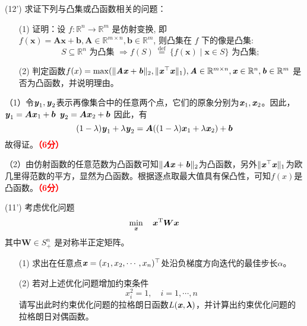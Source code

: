 \documentclass[12pt,a4paper,openany,twoside]{ctexbook}
\begin{document}
\begin{exercise}(12')
	求证下列与凸集或凸函数相关的问题：
	\begin{itemize}
		\item[(1)] 证明：设 $f: \mathbb{R}^{n} \rightarrow \mathbb{R}^{m}$ 是仿射变换, 即 $f(\boldsymbol{x})=\boldsymbol{A} \boldsymbol{x}+\boldsymbol{b}, \boldsymbol{A} \in \mathbb{R}^{m \times n}, \boldsymbol{b} \in \mathbb{R}^{m}$, 则凸集在 $f$ 下的像是凸集:
		$$
		S \subseteq \mathbb{R}^{n} \text { 为凸集 } \Rightarrow f(S) \stackrel{\text { def }}{=}\{f(\boldsymbol{x}) \mid \boldsymbol{x} \in S\} \text { 为凸集; }
		$$
		\item [(2)] 判定函数$f(x)=\max(\|\boldsymbol{\mathit{A}}\boldsymbol{\mathit{x}}+\boldsymbol{\mathit{b}}\|_2,\|\boldsymbol{\mathit{x}}^\top \boldsymbol{\mathit{x}}\|_1),\boldsymbol{\mathit{A}}\in \mathbb{R}^{m\times n}, \boldsymbol{\mathit{x}}\in \mathbb{R}^{n}, \boldsymbol{\mathit{b}}\in \mathbb{R}^m$ 是否为凸函数，并说明理由。
	\end{itemize}
\end{exercise}
\begin{Solution}
	（1）令$\boldsymbol{\mathit{y}}_1, \boldsymbol{\mathit{y}}_2$表示再像集合中的任意两个点，它们的原象分别为$\boldsymbol{\mathit{x}}_1, \boldsymbol{\mathit{x}}_2$。因此，
	$\boldsymbol{\mathit{y}}_1=\boldsymbol{A} \boldsymbol{x}_1+\boldsymbol{b}$
	$\boldsymbol{\mathit{y}}_2=\boldsymbol{A} \boldsymbol{x}_2+\boldsymbol{b}$
	因此，有
	$$(1-\lambda)\boldsymbol{\mathit{y}}_1+\lambda\boldsymbol{\mathit{y}}_2=\boldsymbol{A} ((1-\lambda)\boldsymbol{x}_1 + \lambda \boldsymbol{\mathit{x}}_2)+\boldsymbol{b}$$
	故得证。\hfill \textcolor{red}{\textbf{（6分）}}
	
	（2）由仿射函数的任意范数为凸函数可知$\|\boldsymbol{\mathit{A}}\boldsymbol{\mathit{x}}+\boldsymbol{\mathit{b}}\|_2$为凸函数，另外$\|\boldsymbol{\mathit{x}}^\top \boldsymbol{\mathit{x}}\|_1$为欧几里得范数的平方，显然为凸函数。根据逐点取最大值具有保凸性，可知$f(x)$是凸函数。\hfill \textcolor{red}{\textbf{（6分）}}
\end{Solution}

\begin{exercise}(11')
	考虑优化问题
	$$
	\min_{\boldsymbol{\mathit{x}}} \quad \boldsymbol{x}^{\mathrm{T}} \boldsymbol{W} \boldsymbol{x}
	$$
	其中$\boldsymbol{W} \in S_+^{n}$ 是对称半正定矩阵。
	
	\begin{itemize}
		\item [(1)] 求出在任意点$ \boldsymbol{\mathit{x}} = (x_1,x_2,\cdots,x_n)^\top $处沿负梯度方向迭代的最佳步长$\alpha$。
		\item[(2)] 若对上述优化问题增加约束条件
		$$x_{i}^{2}=1, \quad i=1, \cdots, n$$
		请写出此时约束优化问题的拉格朗日函数$ L(\boldsymbol{\mathit{x}},\boldsymbol{\lambda}) $，并计算出约束优化问题的拉格朗日对偶函数。
	\end{itemize}
\end{exercise}
\end{document}
